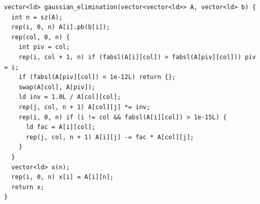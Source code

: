 \begin{lstlisting}
vector<ld> gaussian_elimination(vector<vector<ld>> A, vector<ld> b) {
  int n = sz(A);
  rep(i, 0, n) A[i].pb(b[i]);
  rep(col, 0, n) {
    int piv = col;
    rep(i, col + 1, n) if (fabsl(A[i][col]) > fabsl(A[piv][col])) piv = i;
    if (fabsl(A[piv][col]) < 1e-12L) return {};
    swap(A[col], A[piv]);
    ld inv = 1.0L / A[col][col];
    rep(j, col, n + 1) A[col][j] *= inv;
    rep(i, 0, n) if (i != col && fabsl(A[i][col]) > 1e-15L) {
      ld fac = A[i][col];
      rep(j, col, n + 1) A[i][j] -= fac * A[col][j];
    }
  }
  vector<ld> x(n);
  rep(i, 0, n) x[i] = A[i][n];
  return x;
}
\end{lstlisting}
